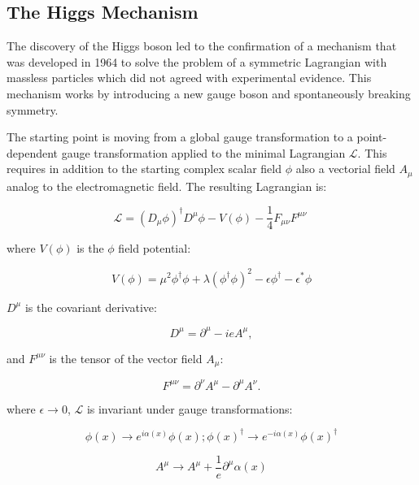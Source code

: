 \subsection{The Higgs Mechanism}
\label{higgs_mechanism}

The discovery of the Higgs boson led to the confirmation of a mechanism that was developed in 1964 to solve the problem of a symmetric Lagrangian with massless particles which did not agreed with experimental evidence. This mechanism works by introducing a new gauge boson and spontaneously breaking symmetry.

The starting point is moving from a global gauge transformation to a point-dependent gauge transformation applied to the minimal Lagrangian $\mathcal{L}$. This requires in addition to the starting complex scalar field $\phi$ also a vectorial field $A_{\mu}$ analog to the electromagnetic field. The resulting Lagrangian is:

\begin{equation}
\mathcal{L} = (D_{\mu}\phi)^{\dagger} D^{\mu}\phi - V (\phi) - \dfrac{1}{4}F_{\mu\nu}F^{\mu\nu}\
\label{eq::lagrangian_min}
\end{equation}

where $V(\phi)$ is the $\phi$ field potential:

\begin{equation}
V(\phi)=\mu^{2}\phi^{\dagger}\phi+\lambda(\phi^{\dagger}\phi)^{2} -\epsilon\phi^{\dagger} -\epsilon^{*}\phi
\end{equation}

$D^{\mu}$ is the covariant derivative:

\begin{equation}
D^{\mu} = \partial^{\mu} - ieA^{\mu},
\end{equation}

and $F^{\mu\nu}$ is the tensor of the vector field $A_{\mu}$:

\begin{equation}
F^{\mu\nu} =\partial^{\nu}A^{\mu} - \partial^{\mu}A^{\nu}.
\end{equation}

where $\epsilon \rightarrow 0$, $\mathcal{L}$ is invariant under gauge transformations:

\begin{equation}
\phi(x) \rightarrow e^{i\alpha(x)}\phi(x); \phi(x)^{\dagger} \rightarrow e ^{-i\alpha(x)}\phi(x)^{\dagger}
\end{equation}

\begin{equation}
A^{\mu} \rightarrow A^{\mu} + \dfrac{1}{e}\partial^{\mu}\alpha(x)
\label{eq::a_tranform}
\end{equation}

